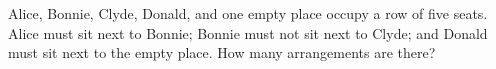 Alice, Bonnie, Clyde, Donald, and one empty place occupy a row of five seats. Alice must sit next to Bonnie; Bonnie must not sit next to Clyde; and Donald must sit next to the empty place. How many arrangements are there?
